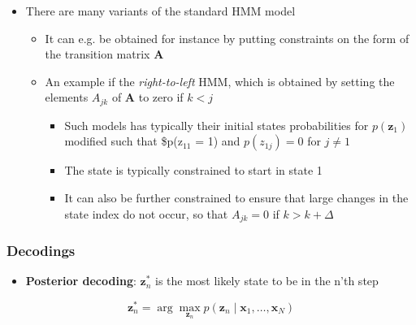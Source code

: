 \documentclass[11pt]{article}
\begin{document}
\begin{itemize}
\item There are many variants of the standard HMM model
\begin{itemize}
\item It can e.g. be obtained for instance by putting constraints on the form of the transition matrix \(\pmb A\)
\item An example if the \emph{right-to-left} HMM, which is obtained by setting the elements \(A_{jk}\) of \(\pmb A\) to zero if \(k<j\) 
\begin{itemize}
\item Such models has typically their initial states probabilities for \(p(\pmb z_1)\) modified such that \$p(z\(_{\text{11}}\) = 1) and \(p(z_{1j}) = 0\) for \(j \ne 1\)
\item The state is typically constrained to start in state 1
\item It can also be further constrained to ensure that large changes in the state index do not occur, so that \(A_{jk} = 0\) if \(k>k+ \Delta\)
\end{itemize}
\end{itemize}
\end{itemize}

\subsubsection{Decodings}
\label{sec:org094dfc6}
\begin{itemize}
\item \textbf{Posterior decoding}: \(\pmb z^*_n\) is the most likely state to be in the n'th step
\end{itemize}
\begin{equation}
  \pmb z^*_n = \arg \max_{\pmb z_n} p(\pmb z_n \mid \pmb x_1, \dots, \pmb x_N)
\end{equation}
\end{document}
